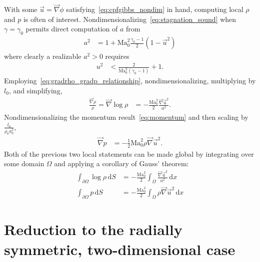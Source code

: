 \documentclass[letterpaper,11pt,nointlimits,reqno]{amsart}
\newcommand{\Mach}[1][]{\mbox{Ma}_{#1}}
\begin{document}
With some $\vec{u}=\vec{\nabla}\phi$ satisfying~\eqref{eq:cpfgibbs_nondim} in
hand, computing local $\rho$ and $p$ is often of interest.
Nondimensionalizing~\eqref{eq:stagnation_sound} when $\gamma=\gamma_0$ permits
direct computation of $a$ from
\begin{align}
  a^2 &= 1 + \Mach[0]^2\frac{\gamma_0-1}{2}\left(1-\vec{u}^2\right)
\label{eq:stagnation_sound_nondim}
\end{align}
where clearly a realizable $a^2>0$ requires
\begin{align}
  u^2 &< \frac{2}{\Mach[0]^2\left(\gamma_0-1\right)} + 1
.
\label{eq:stagnation_sound_realizability_nondim}
\end{align}
Employing~\eqref{eq:gradrho_gradp_relationship},
nondimensionalizing, multiplying by $l_0$, and simplifying,
\begin{align}
  \frac{\vec{\nabla}\rho}{\rho}
  =
  \vec{\nabla}\log\rho
  &=
  -\frac{\Mach[0]^2}{2}\frac{\vec{\nabla}\vec{u}^2}{a^2}
.
\end{align}
Nondimensionalizing the momentum result~\eqref{eq:momentum} and then scaling by
$\frac{l_0}{\rho_0 a_0^2}$,
\begin{align}
  \vec{\nabla} p &= - \frac{1}{2}\Mach[0]^2 \rho \vec{\nabla}\vec{u}^2
.
\end{align}
Both of the previous two local statements can be made global by integrating
over some domain $\Omega$ and applying a corollary of Gauss' theorem:
\begin{align}
  \int_{\partial\Omega} \log\rho \, \mathrm{d}S
  &=
  - \frac{\Mach[0]^2}{2}\int_{\Omega}
    \frac{\vec{\nabla}\vec{u}^2}{a^2} \, \mathrm{d}x
\label{eq:logrho_nondim}
\\
  \int_{\partial\Omega} p \, \mathrm{d}S
  &=
  - \frac{\Mach[0]^2}{2}\int_{\Omega} \rho \vec{\nabla}\vec{u}^2 \, \mathrm{d}x
\label{eq:p_nondim}
\end{align}

\section{Reduction to the radially symmetric, two-dimensional case}
\end{document}
